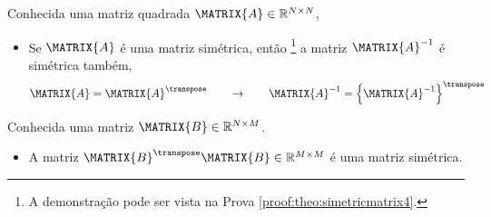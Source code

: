 \begin{theorem}\label{theo:simetricmatrix4}
Conhecida uma matriz quadrada $\MATRIX{A} \in \mathbb{R}^{N \times N}$, 
\begin{itemize}
\item Se $\MATRIX{A}$ é uma matriz simétrica, então
\footnote{A demonstração pode ser vista na Prova \ref{proof:theo:simetricmatrix4}.} 
 a matriz $\MATRIX{A}^{-1}$  é simétrica também,
\begin{equation}
\MATRIX{A}=\MATRIX{A}^{\transpose}
\qquad \rightarrow \qquad
\MATRIX{A}^{-1}=\left\{\MATRIX{A}^{-1}\right\}^{\transpose}
\end{equation}
\end{itemize}
\end{theorem}

\begin{lema}\label{lema:simetricmatrix5}
Conhecida uma matriz $\MATRIX{B} \in \mathbb{R}^{N \times M}$.
\begin{itemize}
\item A matriz $\MATRIX{B}^{\transpose}\MATRIX{B} \in \mathbb{R}^{M \times M}$ é uma matriz simétrica.
\end{itemize}
\end{lema}


